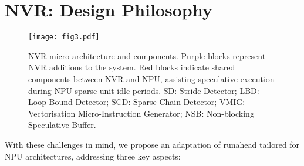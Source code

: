 \section{NVR: Design Philosophy}

\begin{figure*}[t]
\vspace{-18pt}
\hspace{-15pt}
\texttt{[image: fig3.pdf]}
\vspace{-25pt}
    \caption{NVR micro-architecture and components. Purple blocks represent NVR additions to the system. Red blocks indicate shared components between NVR and NPU, assisting speculative execution during NPU sparse unit idle periods.  SD: Stride Detector;  LBD: Loop Bound Detector;  SCD: Sparse Chain Detector;  VMIG: Vectorisation Micro-Instruction Generator;  NSB: Non-blocking Speculative Buffer.} %
\vspace{-15pt}
\label{fig:fig3}
\end{figure*}

With these challenges in mind, we propose an adaptation of runahead tailored for NPU architectures, addressing three key aspects:



